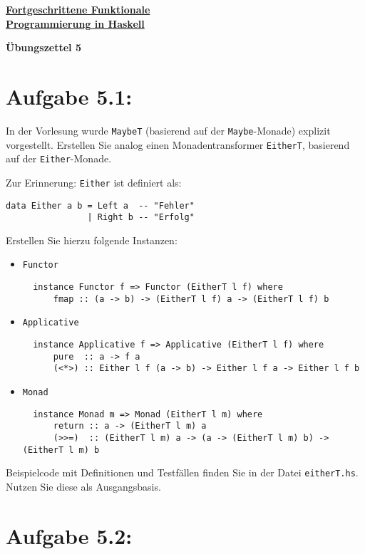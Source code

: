 \documentclass[a4paper,10pt]{scrartcl}
\newcommand{\underfat}[1]{\underline{\textbf{#1}}}
\newcommand{\theuebungszettel}{5}
\begin{document}
\begin{center}
  \begin{huge}
    \underfat{Fortgeschrittene Funktionale}\\
    \underfat{Programmierung in Haskell}\\
  \end{huge}
\begin{LARGE}
\textbf{Übungszettel \theuebungszettel}
\end{LARGE}
\end{center}
\section*{Aufgabe \theuebungszettel.1:}
In der Vorlesung wurde \texttt{MaybeT} (basierend auf der \texttt{Maybe}-Monade) explizit vorgestellt. Erstellen Sie analog einen Monadentransformer \texttt{EitherT}, basierend auf der \texttt{Either}-Monade.\smallskip

Zur Erinnerung: \texttt{Either} ist definiert als:
\begin{verbatim}
data Either a b = Left a  -- "Fehler"
                | Right b -- "Erfolg"
\end{verbatim}
Erstellen Sie hierzu folgende Instanzen:
\begin{itemize}
 \item \texttt{Functor}
       \begin{verbatim}
  instance Functor f => Functor (EitherT l f) where
      fmap :: (a -> b) -> (EitherT l f) a -> (EitherT l f) b
       \end{verbatim}
 \item \texttt{Applicative}
       \begin{verbatim}
  instance Applicative f => Applicative (EitherT l f) where
      pure  :: a -> f a
      (<*>) :: Either l f (a -> b) -> Either l f a -> Either l f b
       \end{verbatim}
 \item \texttt{Monad}
       \begin{verbatim}
  instance Monad m => Monad (EitherT l m) where
      return :: a -> (EitherT l m) a
      (>>=)  :: (EitherT l m) a -> (a -> (EitherT l m) b) -> (EitherT l m) b
       \end{verbatim}
\end{itemize}
Beispielcode mit Definitionen und Testfällen finden Sie in der Datei \texttt{eitherT.hs}. Nutzen Sie diese als Ausgangsbasis.

\section*{Aufgabe \theuebungszettel.2:}
\end{document}
